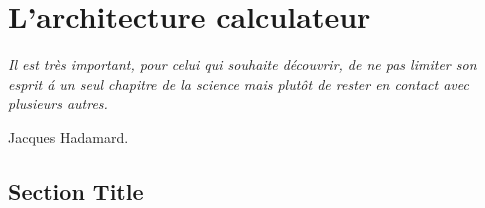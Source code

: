 
\chapter{L'architecture calculateur} \label{CHAP3}
\smallskip
\hfill
\begin{minipage}[b]{8cm}
{\it Il est tr\`es important, pour celui qui souhaite d\'ecouvrir, de ne pas limiter son esprit \'a un seul chapitre de la
science mais plut\^ot de rester en contact avec plusieurs autres.}
\end{minipage}
\begin{flushright} Jacques Hadamard. \end{flushright}
\vskip 2cm


\section{Section Title}

